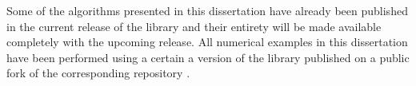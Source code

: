 Some of the algorithms presented in this dissertation have already been published in the current release of the \dealii{} library \parencite{arndt2019,dealii920pre} and their entirety will be made available completely with the upcoming release. All numerical examples in this dissertation have been performed using a certain a version of the library published on a public fork \textcite{finaldissertation} of the corresponding \dealii{} repository \textcite{dealii920pre}.
